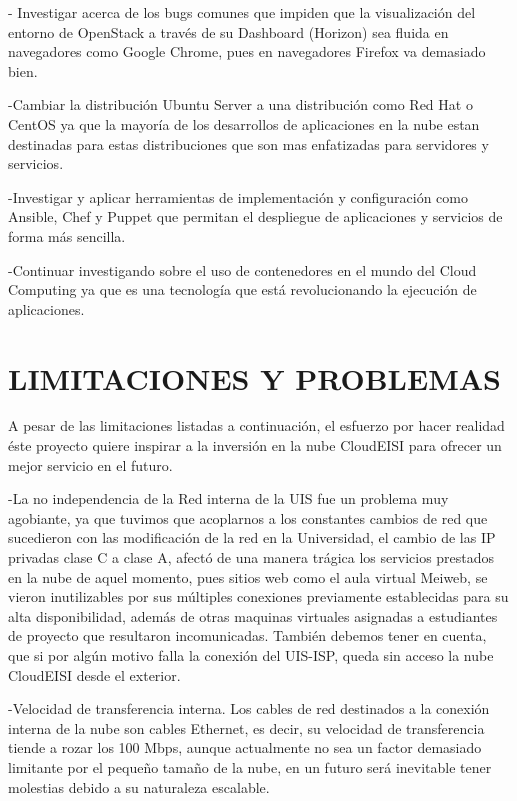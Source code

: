     - Investigar acerca de los bugs comunes que impiden que la visualización del entorno de OpenStack a través de su Dashboard (Horizon) sea fluida en navegadores como Google Chrome, pues en navegadores Firefox va demasiado bien.
    
    -Cambiar la distribución Ubuntu Server a una distribución como Red Hat o CentOS ya que la mayoría de los desarrollos de aplicaciones en la nube estan destinadas para estas distribuciones que son mas enfatizadas para servidores y servicios.
    
    -Investigar y aplicar herramientas de implementación y configuración como Ansible, Chef y Puppet que permitan el despliegue de aplicaciones y servicios de forma más sencilla.
    
    
    -Continuar investigando sobre el uso de contenedores en el mundo del Cloud Computing ya que es una tecnología que está revolucionando la ejecución de aplicaciones.
    
    
    
    \newpage\chapter{LIMITACIONES Y PROBLEMAS} 
    
    A pesar de las limitaciones listadas  a continuación, el esfuerzo por hacer realidad éste proyecto quiere inspirar a la inversión en la nube CloudEISI para ofrecer un mejor servicio en el futuro.
    
    -La no independencia de la Red interna de la UIS fue un problema muy agobiante,  ya que tuvimos que acoplarnos a los constantes cambios de red que sucedieron con las modificación de la red en la Universidad, el cambio de  las IP privadas clase C  a clase A, afectó de una manera trágica los servicios prestados en la nube de aquel momento, pues sitios web como el aula virtual Meiweb, se vieron inutilizables por sus múltiples conexiones previamente establecidas para su alta disponibilidad, además de otras maquinas virtuales asignadas a estudiantes de proyecto que resultaron incomunicadas. También debemos tener en cuenta, que si por algún motivo falla la conexión del UIS-ISP, queda sin acceso la nube CloudEISI desde el exterior.
    
    -Velocidad de transferencia interna. Los cables de red destinados a la conexión interna de la nube son cables Ethernet, es decir, su velocidad de transferencia tiende a rozar los 100 Mbps, aunque actualmente no sea un factor demasiado limitante por el pequeño tamaño de la nube, en un futuro será inevitable tener molestias debido a su naturaleza escalable.
    
